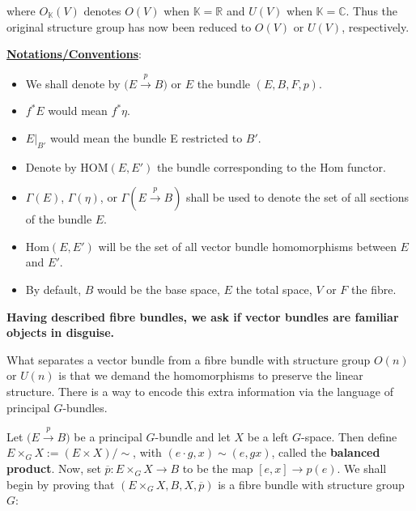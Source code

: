 \documentclass[11pt,a4paper]{article}
\begin{document}
where $O_{\mathbb{K}}(V)$ denotes $O(V)$ when $\mathbb K=\mathbb R$ and $U(V)$ when $\mathbb K=\mathbb C$. Thus the original structure group has now been reduced to $O(V)$ or $U(V)$, respectively.

\underline{\textbf{Notations/Conventions}}:

\begin{itemize}
    \item We shall denote by $\big(E\xrightarrow{p}B\big)$ or $E$ the bundle $(E, B, F, p)$.
    \item $f^*E$ would mean $f^*\eta$.
    \item $E\big|_{B'}$ would mean the bundle E restricted to $B'$.
    \item Denote by $\text{HOM}(E, E')$ the bundle corresponding to the Hom functor.
    \item $\Gamma(E)$, $\Gamma(\eta)$, or $\Gamma(E\xrightarrow{p}B)$ shall be used to denote the set of all sections of the bundle $E$.
    \item $\text{Hom}(E, E')$ will be the set of all vector bundle homomorphisms between $E$ and $E'$.
    \item By default, $B$ would be the base space, $E$ the total space, $V$ or $F$ the fibre.
\end{itemize}


\begin{center}
\textbf{Having described fibre bundles, we ask if vector bundles are familiar objects in disguise.}
\end{center}

What separates a vector bundle from a fibre bundle with structure group $O(n)$ or $U(n)$ is that we demand the homomorphisms to preserve the linear structure. There is a way to encode this extra information via the language of principal $G$-bundles.

Let $\big(E\xrightarrow{p} B\big)$ be a principal $G$-bundle and let $X$ be a left $G$-space. Then define $E\times_G X:= (E\times X)/\sim$, with $(e\cdot g, x) \sim (e, gx)$, called the \textbf{balanced product}. Now, set $\overline{p}: E\times_G X \rightarrow B$ to be the map $[e, x] \rightarrow p(e)$. We shall begin by proving that $(E\times_G X, B, X, \overline{p})$ is a fibre bundle with structure group $G$:
\end{document}
